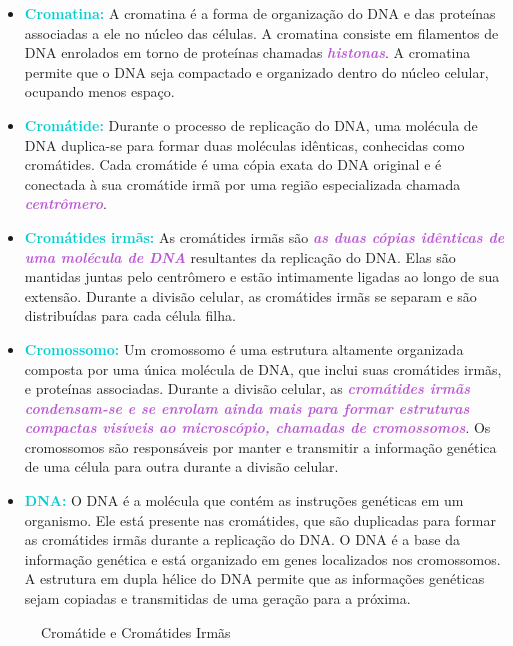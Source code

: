 \documentclass[11pt,a4paper]{article}
\begin{document}
    \begin{itemize}
		\item \textcolor{DarkTurquoise}{\textbf{Cromatina:}} A cromatina é a forma de organização do DNA e das proteínas associadas a ele no núcleo das células. A cromatina consiste em filamentos de DNA enrolados em torno de proteínas chamadas \textcolor{MediumOrchid}{\textbf{\textit{histonas}}}. A cromatina permite que o DNA seja compactado e organizado dentro do núcleo celular, ocupando menos espaço.
		\item \textcolor{DarkTurquoise}{\textbf{Cromátide:}} Durante o processo de replicação do DNA, uma molécula de DNA duplica-se para formar duas moléculas idênticas, conhecidas como cromátides. Cada cromátide é uma cópia exata do DNA original e é conectada à sua cromátide irmã por uma região especializada chamada \textcolor{MediumOrchid}{\textbf{\textit{centrômero}}}.
		\item \textcolor{DarkTurquoise}{\textbf{Cromátides irmãs:}} As cromátides irmãs são \textcolor{MediumOrchid}{\textbf{\textit{as duas cópias idênticas de uma molécula de DNA}}} resultantes da replicação do DNA. Elas são mantidas juntas pelo centrômero e estão intimamente ligadas ao longo de sua extensão. Durante a divisão celular, as cromátides irmãs se separam e são distribuídas para cada célula filha.
		\item \textcolor{DarkTurquoise}{\textbf{Cromossomo:}} Um cromossomo é uma estrutura altamente organizada composta por uma única molécula de DNA, que inclui suas cromátides irmãs, e proteínas associadas. Durante a divisão celular, as \textcolor{MediumOrchid}{\textbf{\textit{cromátides irmãs condensam-se e se enrolam ainda mais para formar estruturas compactas visíveis ao microscópio, chamadas de cromossomos}}}. Os cromossomos são responsáveis por manter e transmitir a informação genética de uma célula para outra durante a divisão celular.
		\item \textcolor{DarkTurquoise}{\textbf{DNA:}} O DNA é a molécula que contém as instruções genéticas em um organismo. Ele está presente nas cromátides, que são duplicadas para formar as cromátides irmãs durante a replicação do DNA. O DNA é a base da informação genética e está organizado em genes localizados nos cromossomos. A estrutura em dupla hélice do DNA permite que as informações genéticas sejam copiadas e transmitidas de uma geração para a próxima.
	\end{itemize}

	\begin{figure}
		\caption{Cromátide e Cromátides Irmãs}
		\label{fig:cromatides}
	\end{figure}
		
\end{document}
